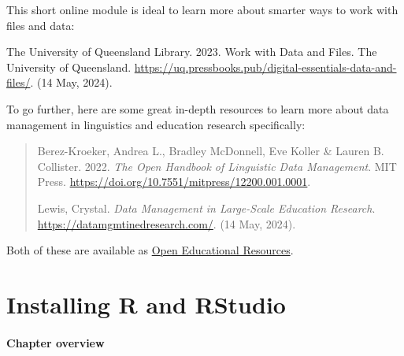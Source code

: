 \documentclass[
  letterpaper,
  DIV=11,
  numbers=noendperiod]{scrreprt}
\begin{document}
\begin{tcolorbox}[enhanced jigsaw, colframe=quarto-callout-note-color-frame, titlerule=0mm, toptitle=1mm, leftrule=.75mm, colbacktitle=quarto-callout-note-color!10!white, title=\textcolor{quarto-callout-note-color}{\faInfo}\hspace{0.5em}{Going further}, bottomtitle=1mm, coltitle=black, breakable, opacitybacktitle=0.6, colback=white, left=2mm, arc=.35mm, opacityback=0, toprule=.15mm, rightrule=.15mm, bottomrule=.15mm]

This short online module is ideal to learn more about smarter ways to
work with files and data:

The University of Queensland Library. 2023. Work with Data and Files.
The University of Queensland.
\url{https://uq.pressbooks.pub/digital-essentials-data-and-files/}. (14
May, 2024).

To go further, here are some great in-depth resources to learn more
about data management in linguistics and education research
specifically:

\begin{quote}
Berez-Kroeker, Andrea L., Bradley McDonnell, Eve Koller \& Lauren B.
Collister. 2022. \emph{The Open Handbook of Linguistic Data Management}.
MIT Press. \url{https://doi.org/10.7551/mitpress/12200.001.0001}.

Lewis, Crystal. \emph{Data Management in Large-Scale Education
Research}. \url{https://datamgmtinedresearch.com/}. (14 May, 2024).
\end{quote}

Both of these are available as
\href{https://elenlefoll.github.io/RstatsTextbook/OpenScholarship.html\#open-education}{Open
Educational Resources}.

\end{tcolorbox}


\chapter{Installing R and RStudio}\label{installing-r-and-rstudio}

\subsubsection*{\texorpdfstring{\textbf{Chapter
overview}}{Chapter overview}}\label{chapter-overview}
\end{document}
